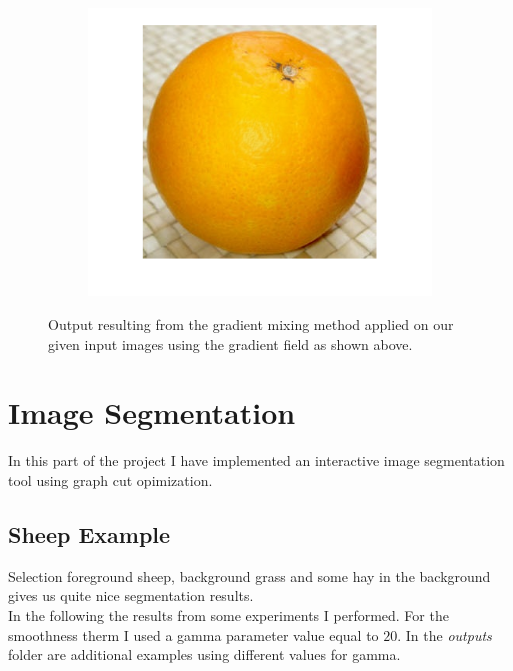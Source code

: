 \documentclass{paper}
\begin{document}
\begin{figure}[H]
    \centering
    \begin{subfigure}{1.0\textwidth}
        \includegraphics[width=\textwidth]{../../outputs/p4/highlight_removal/output_gammacompression}
    \end{subfigure}
    \caption{Output resulting from the gradient mixing method applied on our given input images using the gradient field as shown above.}
    \label{fig:highlight_removal_out_gammacompression}       
\end{figure}


\section{Image Segmentation}

In this part of the project I have implemented an interactive image segmentation tool using graph cut opimization.

\subsection{Sheep Example}

Selection foreground sheep, background grass and some hay in the background gives us quite nice segmentation results. \\

In the following the results from some experiments I performed. For the smoothness therm I used a gamma parameter value equal to $20$. In the \emph{outputs} folder are additional examples using different values for gamma. \\
\end{document}
